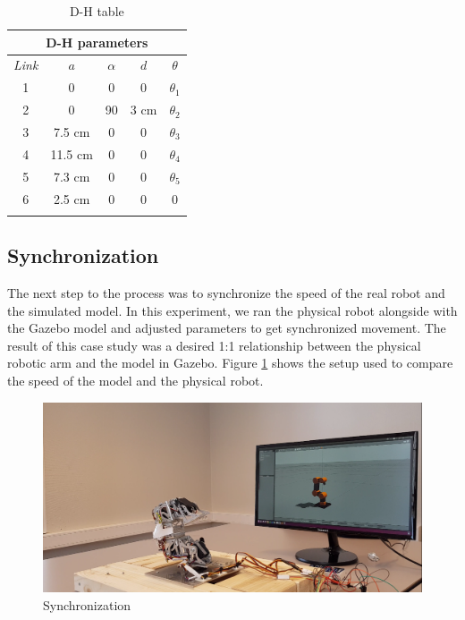 \documentclass[11pt,a4paper, titlepage]{article}
\begin{document}
	\begin{center}           
    \begin{longtable}{| c | c | c | c | c |}
              \hline
                       
\multicolumn{5}{|c|}{\textbf{D-H parameters}} \\ \hline \endhead
\textit{Link} & \textbf{$a$} & \textbf{$\alpha$} & $d$ & \textbf{$\theta$} \\ \hline             
               1 & 0 & 0 &  0 & $\theta_1$ \\ \hline
               2 & 0 & 90 & 3 cm & $\theta_2$ \\ \hline
               3 & 7.5 cm & 0 & 0 & $\theta_3$ \\ \hline
               4 & 11.5 cm & 0 & 0 & $\theta_4$ \\ \hline
               5 & 7.3 cm & 0 & 0 & $\theta_5$ \\ \hline
               6 & 2.5 cm & 0 & 0 & 0 \\ \hline
               
\caption{D-H table}
\label{DH-table}                                       
\end{longtable}
\end{center}

	\subsection{Synchronization}
	The next step to the process was to synchronize the speed of the real robot and the simulated model. In this experiment, we ran the physical robot alongside with the Gazebo model and adjusted parameters to get synchronized movement. The result of this case study was a desired 1:1 relationship between the physical robotic arm and the model in Gazebo. Figure \ref{synch} shows the setup used to compare the speed of the model and the physical robot. 
	
	\begin{figure}[H]
		\centering
		\includegraphics[width=\linewidth]{../Diagrams/Synchronizing.png}
		\caption{Synchronization}
		\label{synch}
	\end{figure}
	
\end{document}
